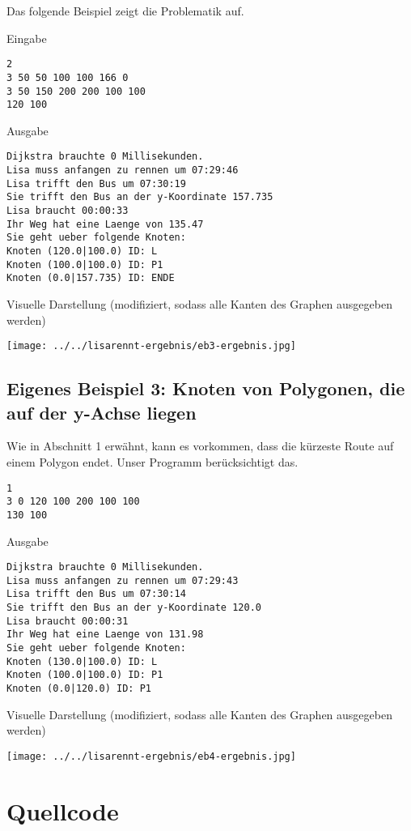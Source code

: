 \documentclass[a4paper,10pt,ngerman]{scrartcl}
\begin{document}
\noindent Das folgende Beispiel zeigt die Problematik auf.

\medskip
\noindent Eingabe
\begin{lstlisting}
2
3 50 50 100 100 166 0
3 50 150 200 200 100 100
120 100
\end{lstlisting}
Ausgabe
\begin{lstlisting}
Dijkstra brauchte 0 Millisekunden.
Lisa muss anfangen zu rennen um 07:29:46
Lisa trifft den Bus um 07:30:19
Sie trifft den Bus an der y-Koordinate 157.735
Lisa braucht 00:00:33
Ihr Weg hat eine Laenge von 135.47
Sie geht ueber folgende Knoten:
Knoten (120.0|100.0) ID: L
Knoten (100.0|100.0) ID: P1
Knoten (0.0|157.735) ID: ENDE
\end{lstlisting}
Visuelle Darstellung (modifiziert, sodass alle Kanten des Graphen ausgegeben werden)
\begin{center}
\texttt{[image: ../../lisarennt-ergebnis/eb3-ergebnis.jpg]} 
\end{center}

\subsection{Eigenes Beispiel 3: Knoten von Polygonen, die auf der y-Achse liegen}
Wie in Abschnitt 1 erwähnt, kann es vorkommen, dass die kürzeste Route auf einem Polygon endet. Unser Programm berücksichtigt das.

\begin{lstlisting}
1
3 0 120 100 200 100 100
130 100
\end{lstlisting}
Ausgabe
\begin{lstlisting}
Dijkstra brauchte 0 Millisekunden.
Lisa muss anfangen zu rennen um 07:29:43
Lisa trifft den Bus um 07:30:14
Sie trifft den Bus an der y-Koordinate 120.0
Lisa braucht 00:00:31
Ihr Weg hat eine Laenge von 131.98
Sie geht ueber folgende Knoten:
Knoten (130.0|100.0) ID: L
Knoten (100.0|100.0) ID: P1
Knoten (0.0|120.0) ID: P1
\end{lstlisting}
Visuelle Darstellung (modifiziert, sodass alle Kanten des Graphen ausgegeben werden)
\begin{center}
\texttt{[image: ../../lisarennt-ergebnis/eb4-ergebnis.jpg]} 
\end{center}

\section{Quellcode}
\lstset{language=Java}
\end{document}
